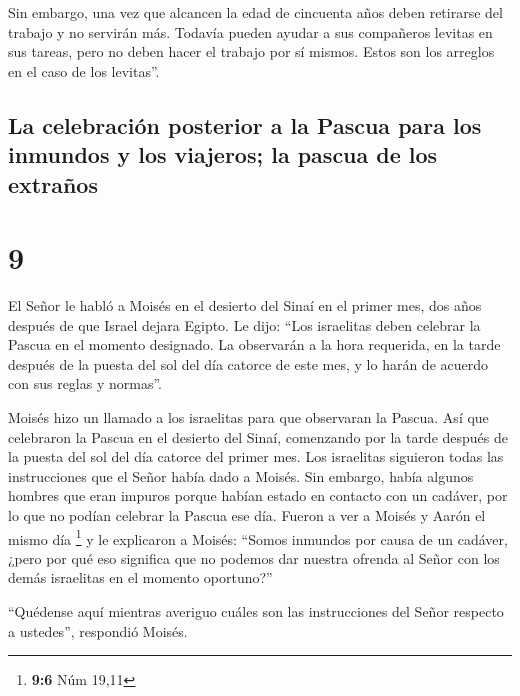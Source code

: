  Sin embargo, una vez que alcancen la edad de cincuenta
años deben retirarse del trabajo y no servirán más. 
Todavía pueden ayudar a sus compañeros levitas en sus tareas, pero no
deben hacer el trabajo por sí mismos. Estos son los arreglos en el caso
de los levitas''.

\hypertarget{la-celebraciuxf3n-posterior-a-la-pascua-para-los-inmundos-y-los-viajeros-la-pascua-de-los-extrauxf1os}{%
\subsection{La celebración posterior a la Pascua para los inmundos y los
viajeros; la pascua de los
extraños}\label{la-celebraciuxf3n-posterior-a-la-pascua-para-los-inmundos-y-los-viajeros-la-pascua-de-los-extrauxf1os}}

\hypertarget{section-8}{%
\section{9}\label{section-8}}

 El Señor le habló a Moisés en el desierto del Sinaí en el
primer mes, dos años después de que Israel dejara Egipto. Le dijo:
 ``Los israelitas deben celebrar la Pascua en el momento
designado.  La observarán a la hora requerida, en la tarde
después de la puesta del sol del día catorce de este mes, y lo harán de
acuerdo con sus reglas y normas''.

 Moisés hizo un llamado a los israelitas para que
observaran la Pascua.  Así que celebraron la Pascua en el
desierto del Sinaí, comenzando por la tarde después de la puesta del sol
del día catorce del primer mes. Los israelitas siguieron todas las
instrucciones que el Señor había dado a Moisés.  Sin
embargo, había algunos hombres que eran impuros porque habían estado en
contacto con un cadáver, por lo que no podían celebrar la Pascua ese
día. Fueron a ver a Moisés y Aarón el mismo día \footnote{\textbf{9:6}
  Núm 19,11}  y le explicaron a Moisés: ``Somos inmundos
por causa de un cadáver, ¿pero por qué eso significa que no podemos dar
nuestra ofrenda al Señor con los demás israelitas en el momento
oportuno?''

 ``Quédense aquí mientras averiguo cuáles son las
instrucciones del Señor respecto a ustedes'', respondió Moisés.

